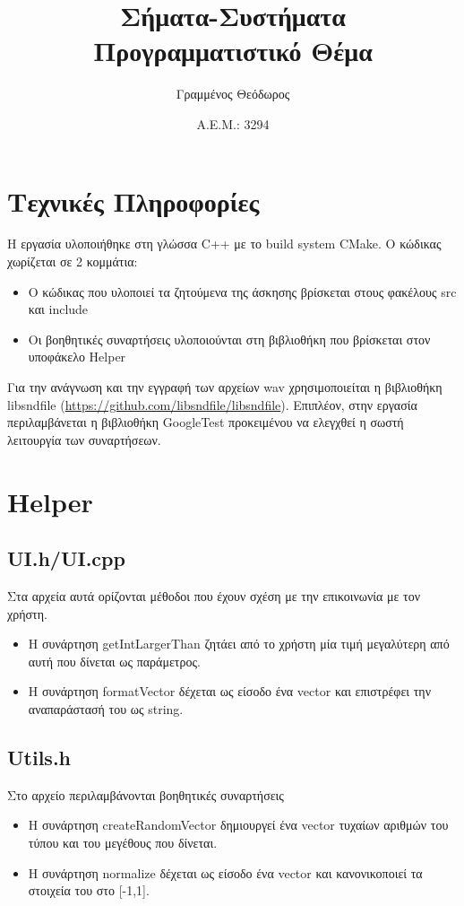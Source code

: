 \documentclass[12pt,a4paper]{article}
\author{Γραμμένος Θεόδωρος}
\title{Σήματα-Συστήματα\\Προγραμματιστικό Θέμα}
\date{Α.Ε.Μ.: 3294}
\begin{document}
    \maketitle
    \section{Τεχνικές Πληροφορίες}
    Η εργασία υλοποιήθηκε στη γλώσσα C++ με το build system CMake.
    Ο κώδικας χωρίζεται σε 2 κομμάτια:
    \begin{itemize}
        \item Ο κώδικας που υλοποιεί τα ζητούμενα της άσκησης βρίσκεται στους φακέλους src και include
        \item Οι βοηθητικές συναρτήσεις υλοποιούνται στη βιβλιοθήκη που βρίσκεται στον υποφάκελο Helper
    \end{itemize}
    Για την ανάγνωση και την εγγραφή των αρχείων wav χρησιμοποιείται η βιβλιοθήκη libsndfile
    (\url{https://github.com/libsndfile/libsndfile}). Επιπλέον, στην εργασία περιλαμβάνεται η βιβλιοθήκη 
    GoogleTest προκειμένου να ελεγχθεί η σωστή λειτουργία των συναρτήσεων.

    \section{Helper}
    \subsection{UI.h/UI.cpp}
    Στα αρχεία αυτά ορίζονται μέθοδοι που έχουν σχέση με την επικοινωνία με τον χρήστη.
    \begin{itemize}
        \item Η συνάρτηση getIntLargerThan ζητάει από το χρήστη μία τιμή μεγαλύτερη από αυτή που δίνεται ως παράμετρος.
        \item Η συνάρτηση formatVector δέχεται ως είσοδο ένα vector και επιστρέφει την αναπαράστασή του ως string.
    \end{itemize}
    \subsection{Utils.h}
    Στο αρχείο περιλαμβάνονται βοηθητικές συναρτήσεις
    \begin{itemize}
        \item Η συνάρτηση createRandomVector δημιουργεί ένα vector τυχαίων αριθμών του τύπου και του μεγέθους που δίνεται.
        \item Η συνάρτηση normalize δέχεται ως είσοδο ένα vector και κανονικοποιεί τα στοιχεία του στο [-1,1].
    \end{itemize}
\end{document}
